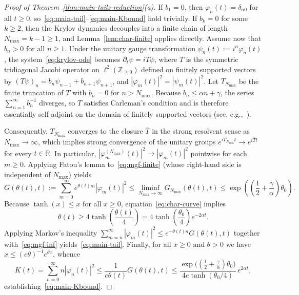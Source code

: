 \documentclass[11pt,a4paper]{article}
\numberwithin{equation}{section}
\theoremstyle{plain}
\theoremstyle{definition}
\begin{document}
\begin{proof}[Proof of Theorem~\ref{thm:main-tails-reduction}(a)]
If $b_1 = 0$, then $\varphi_n(t) = \delta_{n0}$ for all $t\ge 0$, so~\eqref{eq:main-tail}--\eqref{eq:main-Kbound} hold trivially. If $b_k = 0$ for some $k\ge 2$, then the Krylov dynamics decouples into a finite chain of length $N_{\max} = k-1 \ge 1$, and Lemma~\ref{lem:char-finite} applies directly. Assume now that $b_n > 0$ for all $n\ge 1$. Under the unitary gauge transformation $\psi_n(t) := i^n\varphi_n(t)$, the system~\eqref{eq:krylov-ode} becomes $\partial_t\psi = iT\psi$, where $T$ is the symmetric tridiagonal Jacobi operator on $\ell^2(\mathbb{Z}_{\ge 0})$ defined on finitely supported vectors by $(T\psi)_n = b_n\psi_{n-1} + b_{n+1}\psi_{n+1}$, and $|\varphi_m(t)|^2 = |\psi_m(t)|^2$. Let $T_{N_{\max}}$ be the finite truncation of $T$ with $b_n = 0$ for $n > N_{\max}$. Because $b_n \le \alpha n + \gamma$, the series $\sum_{n=1}^\infty b_n^{-1}$ diverges, so $T$ satisfies Carleman's condition and is therefore essentially self-adjoint on the domain of finitely supported vectors (see, e.g.,~\cite{Bratteli1997,Chihara1978}).

Consequently, $T_{N_{\max}}$ converges to the closure $\overline{T}$ in the strong resolvent sense as $N_{\max}\to\infty$, which implies strong convergence of the unitary groups $e^{i T_{N_{\max}} t} \to e^{i\overline{T} t}$ for every $t\in\mathbb{R}$. In particular, $|\varphi_m^{(N_{\max})}(t)|^2 \to |\varphi_m(t)|^2$ pointwise for each $m\ge 0$. Applying Fatou's lemma to~\eqref{eq:mgf-finite} (whose right-hand side is independent of $N_{\max}$) yields
\begin{equation}\label{eq:mgf-inf}
  G(\theta(t),t) := \sum_{m=0}^\infty e^{\theta(t)m}|\varphi_m(t)|^2
  \le \liminf_{N_{\max}\to\infty} G_{N_{\max}}(\theta(t),t)
  \le \exp\!\left(\left(\frac{1}{2}+\frac{\gamma}{\alpha}\right)\theta_0\right).
\end{equation}
Because $\tanh(x) \le x$ for all $x\ge 0$, equation~\eqref{eq:char-curve} implies
\[
  \theta(t) \ge 4\tanh\!\left(\frac{\theta(t)}{4}\right) = 4\tanh\!\left(\frac{\theta_0}{4}\right)e^{-2\alpha t}.
\]
Applying Markov's inequality $\sum_{m=n}^\infty |\varphi_m(t)|^2 \le e^{-\theta(t)n}G(\theta(t),t)$ together with~\eqref{eq:mgf-inf} yields~\eqref{eq:main-tail}. Finally, for all $x\ge 0$ and $\theta > 0$ we have $x \le (e\theta)^{-1}e^{\theta x}$, whence
\[
  K(t) = \sum_{n=0}^\infty n|\varphi_n(t)|^2 \le \frac{1}{e\theta(t)} G(\theta(t),t)
  \le \frac{\exp\!\bigl((\frac{1}{2}+\frac{\gamma}{\alpha})\theta_0\bigr)}{4e\tanh(\theta_0/4)}\,e^{2\alpha t},
\]
establishing~\eqref{eq:main-Kbound}.
\end{proof}
\end{document}
